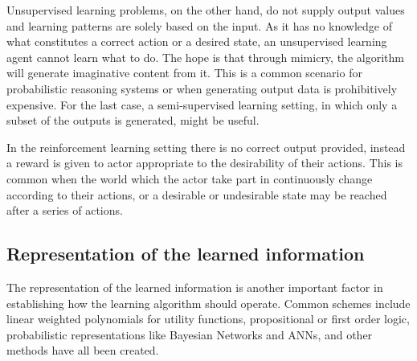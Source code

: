 Unsupervised learning problems, on the other hand, do not supply output values and learning patterns are solely based on the input. As it has no knowledge of what constitutes a correct action or a desired state, an unsupervised learning agent cannot learn what to do. The hope is that through mimicry, the algorithm will generate imaginative content from it. This is a common scenario for probabilistic reasoning systems or when generating output data is prohibitively expensive. For the last case, a semi-supervised learning setting, in which only a subset of the outputs is generated, might be useful.

In the reinforcement learning setting there is no correct output provided, instead a reward is given to actor appropriate to the desirability of their actions. This is common when the world which the actor take part in continuously change according to their actions, or a desirable or undesirable state may be reached after a series of actions.

\subsection{Representation of the learned information}
The representation of the learned information is another important factor in establishing how the learning algorithm should operate. Common schemes include linear weighted polynomials for utility functions, propositional or first order logic, probabilistic representations like Bayesian Networks\cite{Probabilistic_Reasoning} and ANNs\cite{McCulloch1943}, and other methods have all been created.

